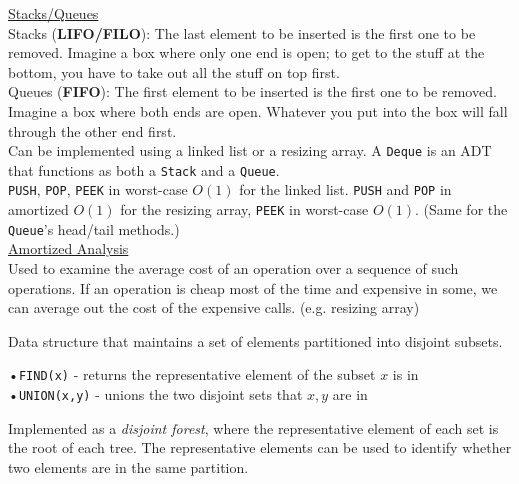 \documentclass[12pt, fleqn]{general}
\begin{document}
\begin{multicols*}{2}

    {\large \underline{Stacks/Queues}}\\

    Stacks (\textbf{LIFO/FILO}): The last element to be inserted is the first one to be removed. Imagine a box where only one end is open; to get to the stuff at the bottom, you have to take out all the stuff on top first.\\

    Queues (\textbf{FIFO}): The first element to be inserted is the first one to be removed. Imagine a box where both ends are open. Whatever you put into the box will fall through the other end first.\\

    Can be implemented using a linked list or a resizing array. A \texttt{Deque} is an ADT that functions as both a \texttt{Stack} and a \texttt{Queue}.\\

    \texttt{PUSH}, \texttt{POP}, \texttt{PEEK} in worst-case $O(1)$ for the linked list. \texttt{PUSH} and \texttt{POP} in amortized $O(1)$ for the resizing array, \texttt{PEEK} in worst-case $O(1)$. (Same for the \texttt{Queue}'s head/tail methods.)\\


    {\large \underline{Amortized Analysis}}\\

    Used to examine the average cost of an operation over a sequence of such operations. If an operation is cheap most of the time and expensive in some, we can average out the cost of the expensive calls. (e.g. resizing array)\\


    Data structure that maintains a set of elements partitioned into disjoint subsets.

    •\texttt{FIND(x)} - returns the representative element of the subset $x$ is in\\
    •\texttt{UNION(x,y)} - unions the two disjoint sets that $x, y$ are in

    Implemented as a \emph{disjoint forest}, where the representative element of each set is the root of each tree. The representative elements can be used to identify whether two elements are in the same partition.


\end{multicols*}
\end{document}
